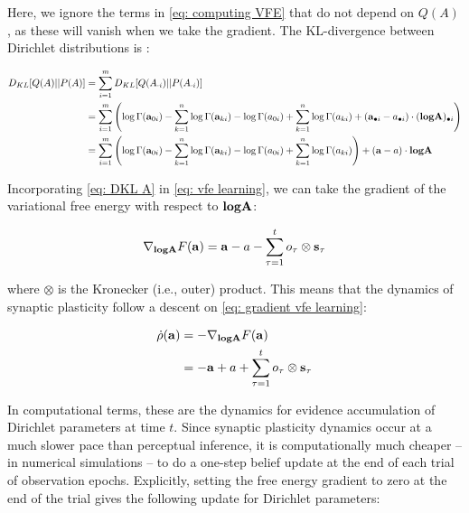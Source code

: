 \documentclass{article}
\begin{document}
Here, we ignore the terms in \eqref{eq: computing VFE} that do not depend on $Q(A)$, as these will vanish when we take the gradient. The KL-divergence between Dirichlet distributions is \cite{kurtKullbackLeiblerDivergenceTwo2013,pennyKLdivergenceNormalGamma2001}:	 
  	
  	\begin{equation}
  	\label{eq: DKL A}
  	    \begin{split}
  	        D_{KL}[Q(A)||P(A)]&=\sum_{i=1}^m D_{KL}[Q(A_{\cdot i})||P(A_{\cdot i})] \\
  	        &= \sum_{i=1}^m \left( \log \Gamma(\bold a_{0i})- \sum_{k=1}^n \log \Gamma(\bold a_{ki}) -\log \Gamma( a_{0i})+ \sum_{k=1}^n \log \Gamma( a_{ki}) + (\bold a_{\bullet i}- a_{\bullet i})\cdot (\textbf{log}\bold A)_{\bullet i}\right) \\
  	        &= \sum_{i=1}^m \left( \log \Gamma(\bold a_{0i})- \sum_{k=1}^n \log \Gamma(\bold a_{ki}) -\log \Gamma( a_{0i})+ \sum_{k=1}^n \log \Gamma( a_{ki})\right) + (\bold a- a)\cdot \textbf{log}\bold A
  	    \end{split}
  	\end{equation}
  	
Incorporating \eqref{eq: DKL A} in \eqref{eq: vfe learning}, we can take the gradient of the variational free energy with respect to $\textbf{log} \bold A$:

  	\begin{equation}
  	\label{eq: gradient vfe learning}
  	    \nabla_{\textbf{log}\bold A} F(\bold a)= \bold a -a -\sum_{\tau =1}^t o_\tau \otimes \bold s_\tau
  	\end{equation}
  	
where $\otimes$ is the Kronecker (i.e., outer) product. This means that the dynamics of synaptic plasticity follow a descent on \eqref{eq: gradient vfe learning}:

    \begin{equation}
    \begin{split}
         \dot \rho(\bold a) &= -\nabla_{\textbf{log}\bold A} F(\bold a)\\
         &= -\bold a +a +\sum_{\tau =1}^t o_\tau \otimes \bold s_\tau
    \end{split}
    \end{equation}

In computational terms, these are the dynamics for evidence accumulation of Dirichlet parameters at time $t$. Since synaptic plasticity dynamics occur at a much slower pace than perceptual inference, it is computationally much cheaper -- in numerical simulations -- to do a one-step belief update at the end of each trial of observation epochs. Explicitly, setting the free energy gradient to zero at the end of the trial gives the following update for Dirichlet parameters:
\end{document}
